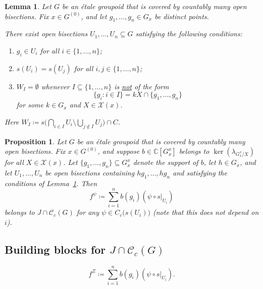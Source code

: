 \documentclass[10pt,a4paper]{amsart}
\newtheorem{lem}{Lemma}
\newtheorem{prp}{Proposition}
\newcommand{\Gu}{G^{(0)}}
\newcommand{\cg}{\mathscr{C}_c(G)}
\begin{document}
\begin{lem}\label{lem:NewWI_condition}
    Let $G$ be an \'etale groupoid that is covered by countably many open bisections.  Fix $x \in \Gu$, and let $g_1, \dots, g_n \in G_{x}$ be distinct points.
    
    There exist open bisections $U_1, \dots, U_n \subseteq G$ satisfying the following conditions:
    \begin{enumerate}[label=(\roman*)]
        \item $g_i \in U_i$ for all $i \in \{1, \dots, n\}$;
        \item $s(U_i) = s(U_j)$ for all $i, j \in \{1, \dots, n\}$;
        \item $W_I = \emptyset$ whenever $I \subseteq \{1, \dotsc, n\}$ is \underline{not} of the form
        \begin{equation}\label{eq:WI_NiceForm}
        \{g_i \colon i \in I\} = kX\cap \{g_1, \dots, g_n\}
        \end{equation}
        for some $k \in G_{x}$ and $X \in \mathcal{X}(x)$.
    \end{enumerate}
    Here $W_I \coloneq s\big( \bigcap_{i \in I} U_i \setminus \bigcup_{j \notin I} U_j \big) \cap C$.    
\end{lem}

\begin{prp}\label{NewCutting}
    Let $G$ be an \'etale groupoid that is covered by countably many open bisections. Fix $x \in \Gu$, and suppose $b \in \mathbb{C}[G^x_x]$ belongs to $\ker(\lambda_{G^x_x/X})$ for all $X \in \mathcal{X}(x)$. Let $\{g_1, \dots, g_n\} \subseteq G^x_x$ denote the support of $b$, let $h \in G_x$, and let $U_1, \dots, U_n$ be open bisections containing $hg_1, \dots, hg_n$ and satisfying the conditions of Lemma~\ref{lem:NewWI_condition}. Then
    \begin{equation}
    \label{f^psi}
    f^\psi \coloneq \sum_{i = 1}^n b(g_i) (\psi \circ s \vert_{U_i})
    \end{equation}
    belongs to $J \cap \cg$ for any $\psi \in C_c\big(s(U_i)\big)$ (note that this does not depend on $i$).
\end{prp}

\subsection{Building blocks for $J \cap \cg$}\label{subsec:BuildingBlocksJcg}

\begin{equation}\label{eq:building_blocks}
f^\Xi \coloneq \sum_{i=1}^n b(g_i) (\psi \circ s \vert_{U_i}).
\end{equation}
\end{document}
